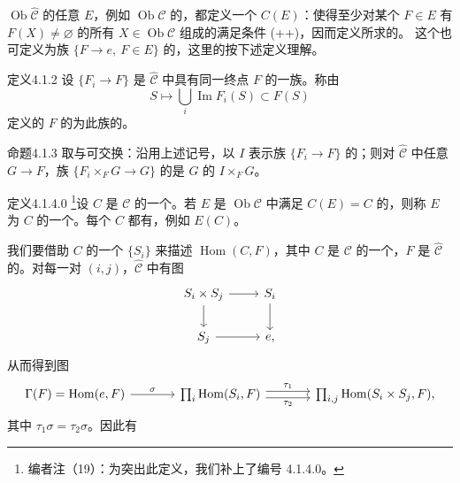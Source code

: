 $\operatorname{Ob}\widehat{\mathcal C}$ 的任意 $E$，例如 $\operatorname{Ob}\mathcal C$ 的，都定义一个 $C(E)$：使得至少对某个 $F\in E$ 有 $F(X)\ne\varnothing$ 的所有 $X\in\operatorname{Ob}\mathcal C$ 组成的满足条件 (++)，因而定义所求的。
这个也可定义为族 $\{F\to e,\ F\in E\}$ 的，这里的按下述定义理解。
\begin{SGAresult}{定义}{4.1.2}
设 $\{F_i\to F\}$ 是 $\widehat{\mathcal C}$ 中具有同一终点 $F$ 的一族。称由
\[
S\longmapsto\bigcup_i\operatorname{Im}F_i(S)\subset F(S)
\]
定义的 $F$ 的为此族的。
\end{SGAresult}
\begin{SGAresult}{命题}{4.1.3}
取与可交换：沿用上述记号，以 $I$ 表示族 $\{F_i\to F\}$ 的；则对 $\widehat{\mathcal C}$ 中任意 $G\to F$，族 $\{F_i\times_F G\to G\}$ 的是 $G$ 的 $I\times_F G$。
\end{SGAresult}
\begin{SGAresult}{定义}{4.1.4.0}
\footnote{编者注（19）：为突出此定义，我们补上了编号 4.1.4.0。}设 $C$ 是 $\mathcal C$ 的一个。若 $E$ 是 $\operatorname{Ob}\mathcal C$ 中满足 $C(E)=C$ 的，则称 $E$ 为 $C$ 的一个。每个 $C$ 都有，例如 $E(C)$。
\end{SGAresult}
我们要借助 $C$ 的一个 $\{S_i\}$ 来描述 $\operatorname{Hom}(C,F)$，其中 $C$ 是 $\mathcal C$ 的一个，$F$ 是 $\widehat{\mathcal C}$ 的。对每一对 $(i,j)$，$\widehat{\mathcal C}$ 中有图
\[
\begin{tikzcd}
S_i\times S_j\arrow[r]\arrow[d]&S_i\arrow[d]\\
S_j\arrow[r]&e,
\end{tikzcd}
\]
从而得到图
\[
\begin{tikzcd}[column sep=large]
\Gamma(F)=\operatorname{Hom}(e,F)\arrow[r,"\sigma"]&
\prod_i\operatorname{Hom}(S_i,F)\arrow[r,shift left=.6ex,"\tau_1"]\arrow[r,shift right=.6ex,"\tau_2"']&
\prod_{i,j}\operatorname{Hom}(S_i\times S_j,F),
\end{tikzcd}
\]
其中 $\tau_1\sigma=\tau_2\sigma$。因此有
